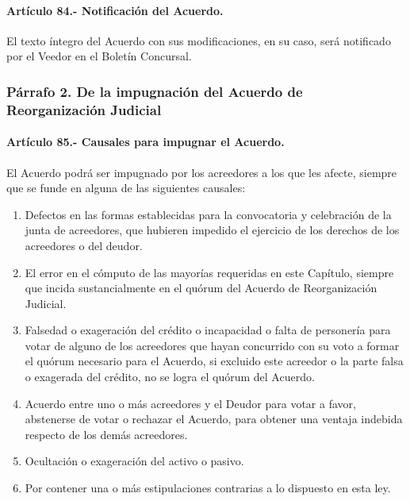 \documentclass[
]{book}
\begin{document}
\hypertarget{artuxedculo-84.--notificaciuxf3n-del-acuerdo.}{%
\paragraph*{Artículo 84.- Notificación del Acuerdo.}\label{artuxedculo-84.--notificaciuxf3n-del-acuerdo.}}

El texto íntegro del Acuerdo con sus modificaciones, en su caso, será notificado por el Veedor en el Boletín Concursal.

\hypertarget{puxe1rrafo-2.-de-la-impugnaciuxf3n-del-acuerdo-de-reorganizaciuxf3n-judicial}{%
\subsubsection*{Párrafo 2. De la impugnación del Acuerdo de Reorganización Judicial}\label{puxe1rrafo-2.-de-la-impugnaciuxf3n-del-acuerdo-de-reorganizaciuxf3n-judicial}}

\hypertarget{artuxedculo-85.--causales-para-impugnar-el-acuerdo.}{%
\paragraph*{Artículo 85.- Causales para impugnar el Acuerdo.}\label{artuxedculo-85.--causales-para-impugnar-el-acuerdo.}}

El Acuerdo podrá ser impugnado por los acreedores a los que les afecte, siempre que se funde en alguna de las siguientes causales:

\begin{enumerate}
\def\labelenumi{\arabic{enumi})}
\item
  Defectos en las formas establecidas para la convocatoria y celebración de la junta de acreedores, que hubieren impedido el ejercicio de los derechos de los acreedores o del deudor.
\item
  El error en el cómputo de las mayorías requeridas en este Capítulo, siempre que incida sustancialmente en el quórum del Acuerdo de Reorganización Judicial.
\item
  Falsedad o exageración del crédito o incapacidad o falta de personería para votar de alguno de los acreedores que hayan concurrido con su voto a formar el quórum necesario para el Acuerdo, si excluido este acreedor o la parte falsa o exagerada del crédito, no se logra el quórum del Acuerdo.
\item
  Acuerdo entre uno o más acreedores y el Deudor para votar a favor, abstenerse de votar o rechazar el Acuerdo, para obtener una ventaja indebida respecto de los demás acreedores.
\item
  Ocultación o exageración del activo o pasivo.
\item
  Por contener una o más estipulaciones contrarias a lo dispuesto en esta ley.
\end{enumerate}
\end{document}
